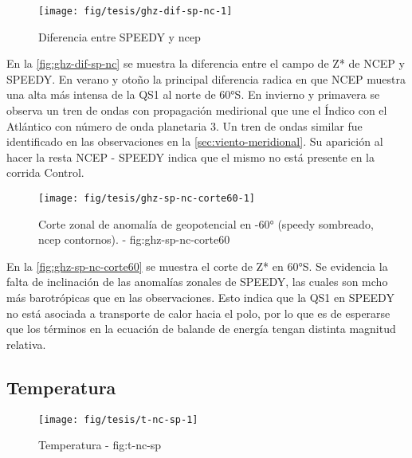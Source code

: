 \documentclass[spanish,a4paper,12p]{book}
\begin{document}
\begin{landscape}\begin{figure}

{\centering \texttt{[image: fig/tesis/ghz-dif-sp-nc-1]} 

}

\caption{Diferencia entre SPEEDY y ncep}\label{fig:ghz-dif-sp-nc}
\end{figure}
\end{landscape}

En la \autoref{fig:ghz-dif-sp-nc} se muestra la diferencia entre el
campo de Z* de NCEP y SPEEDY. En verano y otoño la principal diferencia
radica en que NCEP muestra una alta más intensa de la QS1 al norte de
60°S. En invierno y primavera se observa un tren de ondas con
propagación medirional que une el Índico con el Atlántico con número de
onda planetaria 3. Un tren de ondas similar fue identificado en las
observaciones en la \autoref{sec:viento-meridional}. Su aparición al
hacer la resta NCEP - SPEEDY indica que el mismo no está presente en la
corrida Control.

\begin{figure}

{\centering \texttt{[image: fig/tesis/ghz-sp-nc-corte60-1]} 

}

\caption{Corte zonal de anomalía de geopotencial en -60° (speedy sombreado, ncep contornos). - fig:ghz-sp-nc-corte60}\label{fig:ghz-sp-nc-corte60}
\end{figure}

En la \autoref{fig:ghz-sp-nc-corte60} se muestra el corte de Z* en 60°S.
Se evidencia la falta de inclinación de las anomalías zonales de SPEEDY,
las cuales son mcho más barotrópicas que en las observaciones. Esto
indica que la QS1 en SPEEDY no está asociada a transporte de calor hacia
el polo, por lo que es de esperarse que los términos en la ecuación de
balande de energía tengan distinta magnitud
relativa.

\subsection{Temperatura}\label{temperatura-1}

\begin{landscape}\begin{figure}

{\centering \texttt{[image: fig/tesis/t-nc-sp-1]} 

}

\caption{Temperatura - fig:t-nc-sp}\label{fig:t-nc-sp}
\end{figure}
\end{landscape}
\end{document}
